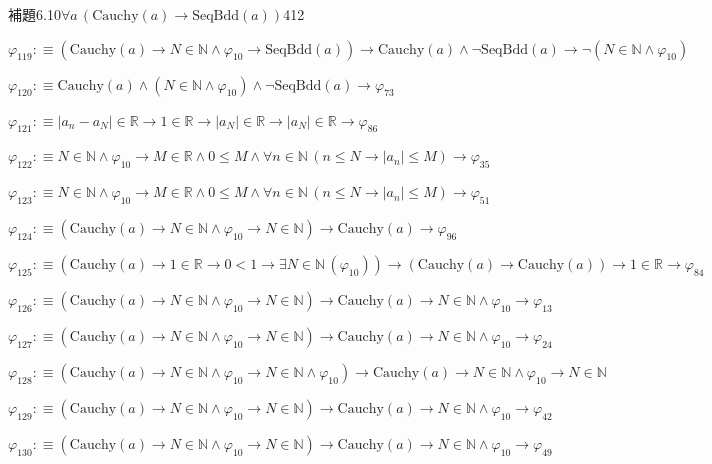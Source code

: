 \begin{fullproof}{補題6.10}{$\forall a\,(\mathrm{Cauchy}(a) \to \mathrm{SeqBdd}(a))$}{412}
\begin{abbrevlist}
\item $\varphi_{119} :\equiv (\mathrm{Cauchy}(a) \to N \in \mathbb{N} \land \varphi_{10} \to \mathrm{SeqBdd}(a)) \to \mathrm{Cauchy}(a) \land \neg \mathrm{SeqBdd}(a) \to \neg (N \in \mathbb{N} \land \varphi_{10})$
\item $\varphi_{120} :\equiv \mathrm{Cauchy}(a) \land (N \in \mathbb{N} \land \varphi_{10}) \land \neg \mathrm{SeqBdd}(a) \to \varphi_{73}$
\item $\varphi_{121} :\equiv \lvert a_{n} - a_{N} \rvert \in \mathbb{R} \to 1 \in \mathbb{R} \to \lvert a_{N} \rvert \in \mathbb{R} \to \lvert a_{N} \rvert \in \mathbb{R} \to \varphi_{86}$
\item $\varphi_{122} :\equiv N \in \mathbb{N} \land \varphi_{10} \to M \in \mathbb{R} \land 0 \leq M \land \forall n \in \mathbb{N}\,(n \leq N \to \lvert a_{n} \rvert \leq M) \to \varphi_{35}$
\item $\varphi_{123} :\equiv N \in \mathbb{N} \land \varphi_{10} \to M \in \mathbb{R} \land 0 \leq M \land \forall n \in \mathbb{N}\,(n \leq N \to \lvert a_{n} \rvert \leq M) \to \varphi_{51}$
\item $\varphi_{124} :\equiv (\mathrm{Cauchy}(a) \to N \in \mathbb{N} \land \varphi_{10} \to N \in \mathbb{N}) \to \mathrm{Cauchy}(a) \to \varphi_{96}$
\item $\varphi_{125} :\equiv (\mathrm{Cauchy}(a) \to 1 \in \mathbb{R} \to 0 < 1 \to \exists N \in \mathbb{N}\,(\varphi_{10})) \to (\mathrm{Cauchy}(a) \to \mathrm{Cauchy}(a)) \to 1 \in \mathbb{R} \to \varphi_{84}$
\item $\varphi_{126} :\equiv (\mathrm{Cauchy}(a) \to N \in \mathbb{N} \land \varphi_{10} \to N \in \mathbb{N}) \to \mathrm{Cauchy}(a) \to N \in \mathbb{N} \land \varphi_{10} \to \varphi_{13}$
\item $\varphi_{127} :\equiv (\mathrm{Cauchy}(a) \to N \in \mathbb{N} \land \varphi_{10} \to N \in \mathbb{N}) \to \mathrm{Cauchy}(a) \to N \in \mathbb{N} \land \varphi_{10} \to \varphi_{24}$
\item $\varphi_{128} :\equiv (\mathrm{Cauchy}(a) \to N \in \mathbb{N} \land \varphi_{10} \to N \in \mathbb{N} \land \varphi_{10}) \to \mathrm{Cauchy}(a) \to N \in \mathbb{N} \land \varphi_{10} \to N \in \mathbb{N}$
\item $\varphi_{129} :\equiv (\mathrm{Cauchy}(a) \to N \in \mathbb{N} \land \varphi_{10} \to N \in \mathbb{N}) \to \mathrm{Cauchy}(a) \to N \in \mathbb{N} \land \varphi_{10} \to \varphi_{42}$
\item $\varphi_{130} :\equiv (\mathrm{Cauchy}(a) \to N \in \mathbb{N} \land \varphi_{10} \to N \in \mathbb{N}) \to \mathrm{Cauchy}(a) \to N \in \mathbb{N} \land \varphi_{10} \to \varphi_{49}$

\end{abbrevlist}
\end{fullproof}
